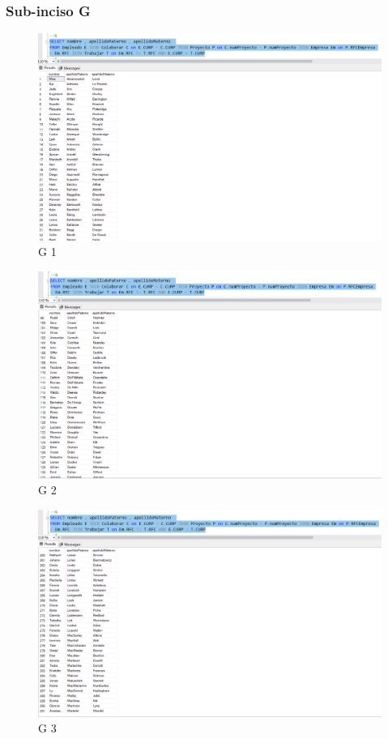 \documentclass[a4paper, 12pt]{report}
\begin{document}
\subsubsection*{Sub-inciso G}
    \begin{figure}
        \includegraphics[width=\textwidth]
            {img/G1.png}\hfill
    \caption{G 1}
    \end{figure}
    \begin{figure}
        \includegraphics[width=\textwidth]
            {img/G2.png}\hfill
    \caption{G 2}
    \end{figure}
    \begin{figure}
        \includegraphics[width=\textwidth]
            {img/G3.png}\hfill
    \caption{G 3}
    \end{figure}
\end{document}

